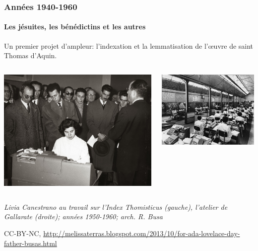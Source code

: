 \documentclass[ignorenonframetext]{beamer}
\begin{document}
\begin{frame}
\frametitle{Années 1940-1960}
\framesubtitle{Les jésuites, les bénédictins et les autres}

Un premier projet d'ampleur: l'indexation et la lemmatisation de l'œuvre de saint Thomas d'Aquin.


\begin{columns}
	\begin{column}{0.5\textwidth}
		\includegraphics[width=\textwidth]{img/livia_canestrano_0085.jpg}
		
	\end{column}
	\begin{column}{0.5\textwidth}
		
		
		\includegraphics[width=\textwidth]{img/thomisticus_0613.jpg}
	\end{column}
\end{columns}

{\footnotesize
	\textit{Livia Canestrano au travail sur l'Index Thomisticus (gauche), l'atelier de Gallarate (droite); années 1950-1960; arch. R. Busa}
	
	CC-BY-NC, \url{http://melissaterras.blogspot.com/2013/10/for-ada-lovelace-day-father-busas.html}
}

\end{frame}
\end{document}
